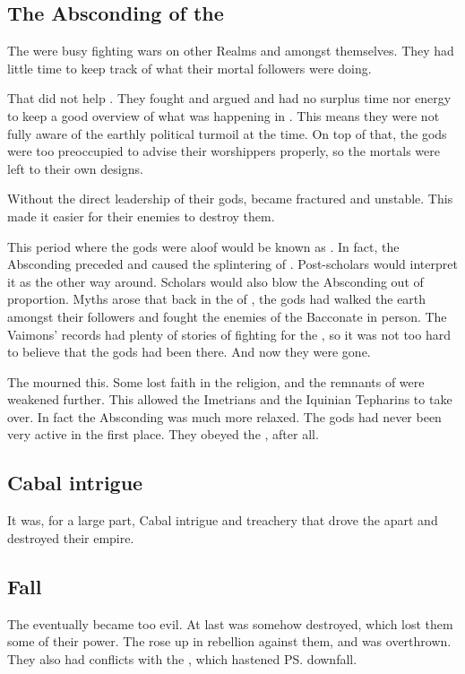 \subsection{The Absconding of the \Taorthae}
The \taorthae were busy fighting wars on other Realms and amongst themselves.
They had little time to keep track of what their mortal followers were doing. 

That did not help \Ortaica. 
They fought and argued and had no surplus time nor energy to keep a good overview of what was happening in \Ortaica. 
This means they were not fully aware of the earthly political turmoil at the time. 
On top of that, the gods were too preoccupied to advise their worshippers properly, so the mortals were left to their own designs. 

Without the direct leadership of their gods, \Ortaica became fractured and unstable. 
This made it easier for their enemies to destroy them. 

This period where the gods were aloof would be known as .
In fact, the Absconding preceded and caused the splintering of \Ortaica.
Post-\Ortaican \rethyactic scholars would interpret it as the other way around.
Scholars would also blow the Absconding out of proportion.
Myths arose that back in the  of \Ortaica, the gods had walked the earth amongst their followers and fought the enemies of the Bacconate in person.
The Vaimons' records had plenty of stories of \daemons fighting for the \Ortaicans, so it was not too hard to believe that the gods had been there. 
And now they were gone. 

The \rethyaxes mourned this.
Some lost faith in the \rethyactic religion, and the remnants of \Ortaica were weakened further.
This allowed the Imetrians and the Iquinian Tepharins to take over.
In fact the Absconding was much more relaxed. 
The gods had never been very active in the first place.
They obeyed the , after all.





\subsection{Cabal intrigue}
It was, for a large part, Cabal intrigue and treachery that drove the \Ortaicans apart and destroyed their empire.





\subsection{Fall}
The \Ortaicans{} eventually became too evil. 
At last \Ishicah was somehow destroyed, which lost them some of their power. 
The  \Tepharites{} rose up in rebellion against them, and \Ortaica{} was overthrown. 
They also had conflicts with the , which hastened \ps{\Ortaica}{} downfall. 

